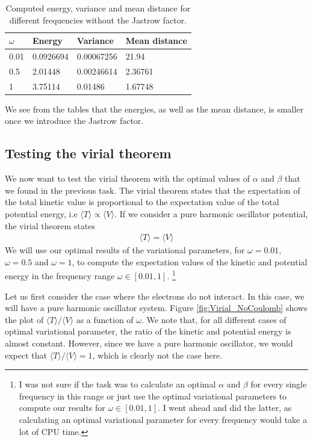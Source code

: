 \documentclass[12pt]{article}
\begin{document}
\begin{table}
\begin{center}
	\begin{tabular}{| l | l | l | l |}
	\hline
	 $\omega$ & Energy & Variance & Mean distance \\ \hline
	 0.01 & 0.0926694 & 0.00067256 & 21.94 \\
	 0.5 & 2.01448 & 0.00246614 & 2.36761 \\
	 1 & 3.75114 & 0.01486 & 1.67748 \\ \hline
	\end{tabular}
\caption{Computed energy, variance and mean distance for different frequencies without the Jastrow factor.}
\end{center}
\label{table:Non-Jastrow-Result}
\end{table}
We see from the tables that the energies, as well as the mean distance, is smaller once we introduce the Jastrow factor. 

\FloatBarrier
\subsection{Testing the virial theorem}
We now want to test the virial theorem with the optimal values of $\alpha$ and $\beta$ that we found in the previous  task. The virial theorem states that the expectation of the total kinetic value is proportional to the expectation value of the total potential energy, i.e $\langle T \rangle \propto \langle V \rangle$. If we consider a pure harmonic oscillator potential, the virial theorem states
\begin{align*}
\langle T \rangle = \langle V \rangle
\end{align*}
We will use our optimal results of the variational parameters, for $\omega = 0.01$, $\omega = 0.5$ and $\omega=1$, to compute the expectation values of the kinetic and potential energy in the frequency range $\omega \in [0.01, 1]$. \footnote{I was not sure if the task was to calculate an optimal $\alpha$ and $\beta$ for every single frequency in this range or just use the optimal variational parameters to compute our results for $\omega \in [0.01, 1]$. I went ahead and did the latter, as calculating an optimal variational parameter for every frequency would take a lot of CPU time.}

Let us first consider the case where the electrons do not interact. In this case, we will have a pure harmonic oscillator system. Figure \ref{fig:Virial_NoCoulomb} shows the plot of $\langle T \rangle / \langle V \rangle$ as a function of $\omega$. We note that, for all different cases of optimal variational parameter, the ratio of the kinetic and potential energy is almost constant. However, since we have a pure harmonic oscillator, we would expect that $\langle T \rangle / \langle V \rangle = 1$, which is clearly not the case here. 
\end{document}
